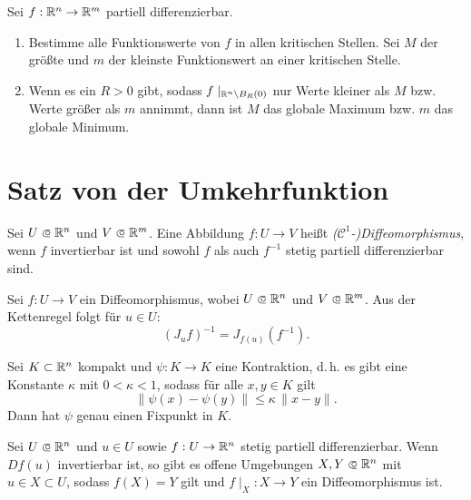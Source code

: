 \documentclass{cheat-sheet}
\newcommand\opn{\mathrel{\ooalign{$\subset$\cr
  \hidewidth\raise.1ex\hbox{$\circ\mkern.5mu$}\cr}}}
\begin{document}
\begin{samepage}

\begin{strat}
Sei $f : \mathbb{R}^n \to \mathbb{R}^m$ partiell differenzierbar.
\begin{enumerate}
  \item Bestimme alle Funktionswerte von $f$ in allen kritischen Stellen. Sei $M$ der größte und $m$ der kleinste Funktionswert an einer kritischen Stelle.
  \item Wenn es ein $R > 0$ gibt, sodass $f\mid_{\mathbb{R}^n \backslash B_R(0)}$ nur Werte kleiner als $M$ bzw. Werte größer als $m$ annimmt, dann ist $M$ das globale Maximum bzw. $m$ das globale Minimum.
\end{enumerate}
\end{strat}


\section{Satz von der Umkehrfunktion}

\end{samepage}

\begin{defn}
Sei $U \opn \R^n$ und $V \opn \R^m$. Eine Abbildung $f : U \to V$ heißt \emph{($\mathcal{C}^1$-)Diffeomorphismus}, wenn $f$ invertierbar ist und sowohl $f$ als auch $f^{-1}$ stetig partiell differenzierbar sind.
\end{defn}

\begin{bem}
Sei $f : U \to V$ ein Diffeomorphismus, wobei $U \opn \R^n$ und $V \opn \R^m$. Aus der Kettenregel folgt für $u \in U$:
\[ (J_u f)^{-1} = J_{f(u)}(f^{-1}). \]
\end{bem}

\begin{satz}
Sei $K \subset \mathbb{R}^n$ kompakt und $\psi : K \to K$ eine Kontraktion, d.\,h. es gibt eine Konstante $\kappa$ mit $0 < \kappa < 1$, sodass für alle $x, y \in K$ gilt
\[ \| \psi(x) - \psi(y) \| \le \kappa\,\| x - y \|. \]
Dann hat $\psi$ genau einen Fixpunkt in $K$.
\end{satz}

\begin{satz}
Sei $U \opn \R^n$ und $u \in U$ sowie $f : U \to \mathbb{R}^n$ stetig partiell differenzierbar. Wenn $D f(u)$ invertierbar ist, so gibt es offene Umgebungen $X, Y \opn \R^n$ mit $u \in X \subset U$, sodass $f(X) = Y$ gilt und $f\mid_X : X \to Y$ ein Diffeomorphismus ist.
\end{satz}
\end{document}
